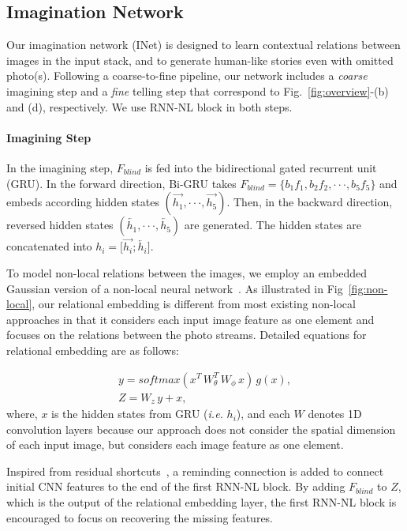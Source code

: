 \documentclass[letterpaper]{article} \usepackage{aaai20}  \usepackage{times}  \usepackage{helvet} \usepackage{courier}  \usepackage[hyphens]{url}  \usepackage{graphicx} \urlstyle{rm} \def\UrlFont{\rm}  \usepackage{graphicx}  \frenchspacing  \setlength{\pdfpagewidth}{8.5in}  \setlength{\pdfpageheight}{11in}
\newcommand{\figfref}[1]{Fig~\ref{#1}}
\newcommand{\figref}[1]{Fig.~\ref{#1}}
\newcommand{\ie}{{\it i.e. }}
\begin{document}
\subsection{Imagination Network}
Our imagination network (INet) is designed to learn contextual relations between images in the input stack, and to generate human-like stories even with omitted photo(s). Following a coarse-to-fine pipeline, our network includes a \textit{coarse} imagining step and a \textit{fine} telling step that correspond to \figref{fig:overview}-(b) and (d), respectively. We use RNN-NL block in both steps.

\paragraph{Imagining Step}
\quad

\noindent
In the imagining step, $F_{blind}$ is fed into the bidirectional gated recurrent unit (GRU). In the forward direction, Bi-GRU takes $F_{blind} = \{ b_{1} f_{1}, b_{2} f_{2}, \cdot\cdot\cdot, b_{5} f_{5} \}$ and embeds according hidden states $( \overrightarrow{h_1}, \cdot\cdot\cdot, \overrightarrow{h_5} )$. Then, in the backward direction, reversed hidden states $( \overleftarrow{h_1}, \cdot\cdot\cdot, \overleftarrow{h_5} )$ are generated. The hidden states are concatenated into $h_i = \big[ \overrightarrow{h_i} ; \overleftarrow{h_i} \big]$.

To model non-local relations between the images, we employ an embedded Gaussian version of a non-local neural network~\cite{vaswani2017attention,wang2018non}. As illustrated in \figfref{fig:non-local}, our relational embedding is different from most existing non-local approaches in that it considers each input image feature as one element and focuses on the relations between the photo streams. Detailed equations for relational embedding are as follows:

\begin{eqnarray}
y = softmax(x^{T} \, W_{\theta}^{T} \, W_{\phi} \, x) \,  g(x), \label{equ:non-local1}\\
Z = W_{z} \, y + x,
\label{equ:non-local2}
\end{eqnarray}
where, $x$ is the hidden states from GRU (\ie $h_i$), and each $W$ denotes 1D convolution layers because our approach does not consider the spatial dimension of each input image, but considers each image feature as one element.


Inspired from residual shortcuts~\cite{he2016deep}, a reminding connection is added to connect initial CNN features to the end of the first RNN-NL block. By adding $F_{blind}$ to $Z$, which is the output of the relational embedding layer, the first RNN-NL block is encouraged to focus on recovering the missing features.
\end{document}
